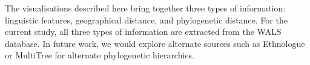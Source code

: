 \documentclass[11pt]{article}
\begin{document}
The visualisations described here bring together three types of information: linguistic features, geographical distance, and phylogenetic distance. For the current study, all three types of information are extracted from the WALS database. In future work, we would explore alternate sources such as Ethnologue \cite{ethnologue} or MultiTree  for alternate phylogenetic hierarchies. 





\end{document}
